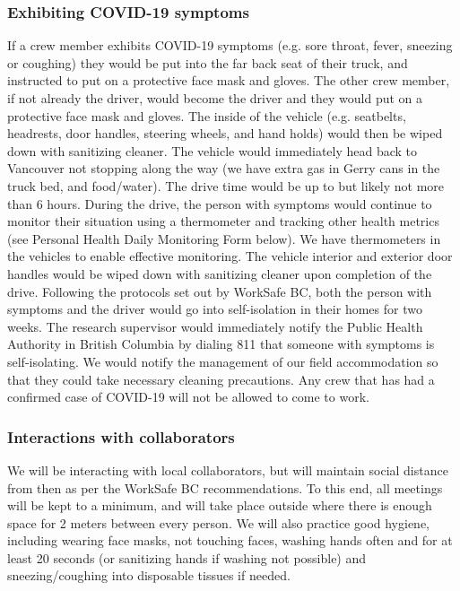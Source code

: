 \documentclass[11pt,letter]{article}
\begin{document}
\subsubsection{Exhibiting COVID-19 symptoms}
If a crew member exhibits COVID-19 symptoms (e.g. sore throat, fever, sneezing or coughing) they would be put into the far back seat of their truck, and instructed to put on a protective face mask and gloves. The other crew member, if not already the driver, would become the driver and they would put on a protective face mask and gloves. The inside of the vehicle (e.g. seatbelts, headrests, door handles, steering wheels, and hand holds) would then be wiped down with sanitizing cleaner. The vehicle would immediately head back to Vancouver not stopping along the way (we have extra gas in Gerry cans in the truck bed, and food/water). The drive time would be up to but likely not more than 6 hours. During the drive, the person with symptoms would continue to monitor their situation using a thermometer and tracking other health metrics (see Personal Health Daily Monitoring Form below). We have thermometers in the vehicles to enable effective monitoring. The vehicle interior and exterior door handles would be wiped down with sanitizing cleaner upon completion of the drive. Following the protocols set out by WorkSafe BC, both the person with symptoms and the driver would go into self-isolation in their homes for two weeks. The research supervisor would immediately notify the Public Health Authority in British Columbia by dialing 811 that someone with symptoms is self-isolating. We would notify the management of our field accommodation so that they could take necessary cleaning precautions.  Any crew that has had a confirmed case of COVID-19 will not be allowed to come to work.

\subsubsection{Interactions with collaborators}
We will be interacting with local collaborators, but will maintain social distance from then as per the WorkSafe BC recommendations. To this end, all meetings will be kept to a minimum, and will take place outside where there is enough space for 2 meters between every person. We will also practice good hygiene, including wearing face masks, not touching faces, washing hands often and for at least 20 seconds (or sanitizing hands if washing not possible) and sneezing/coughing into disposable tissues if needed. 
\end{document}
